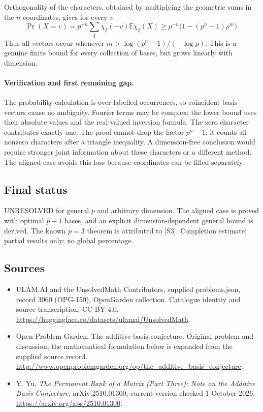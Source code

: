 \documentclass[11pt,a4paper]{article}
\begin{document}
Orthogonality of the characters, obtained by multiplying the geometric
sums in the $n$ coordinates, gives for every $v$
\[
 \Pr(X=v)=p^{-n}\sum_\xi
 \chi_\xi(-v)\mathbb E\chi_\xi(X)
 \ge p^{-n}\bigl(1-(p^n-1)\rho^m\bigr).
\]
Thus all vectors occur whenever
$m>\log(p^n-1)/(-\log\rho)$. This is a genuine finite bound for
every collection of bases, but grows linearly with dimension.

\paragraph{Verification and first remaining gap.}
The probability calculation is over labelled occurrences, so coincident
basis vectors cause no ambiguity. Fourier terms may be complex; the
lower bound uses their absolute values and the real-valued inversion
formula. The zero character contributes exactly one. The proof cannot
drop the factor $p^n-1$: it counts all nonzero characters after a
triangle inequality. A dimension-free conclusion would require stronger
joint information about these characters or a different method. The
aligned case avoids this loss because coordinates can be filled separately.

\subsection{Final status}
UNRESOLVED for general $p$ and arbitrary dimension. The aligned case
is proved with optimal $p-1$ bases, and an explicit dimension-dependent
general bound is derived. The known $p=3$ theorem is attributed to [S3].
Completion estimate: partial results only; no global percentage.

\subsection{Sources}
\begin{itemize}
\item[S1] ULAM.AI and the UnsolvedMath Contributors, supplied problems.json, record 3060 (OPG-150), OpenGarden collection. Catalogue identity and source transcription; CC BY 4.0.
\url{https://huggingface.co/datasets/ulamai/UnsolvedMath}.
\item[S2] Open Problem Garden, The additive basis conjecture. Original problem and discussion; the mathematical formulation below is expanded from the supplied source record.
\url{http://www.openproblemgarden.org/op/the_additive_basis_conjecture}.
\item[S3] Y. Yu, \emph{The Permanent Rank of a Matrix (Part Three): Note on the Additive Basis Conjecture}, arXiv:2510.01300, current version checked 1 October 2026.
\url{https://arxiv.org/abs/2510.01300}.
\end{itemize}
\end{document}
